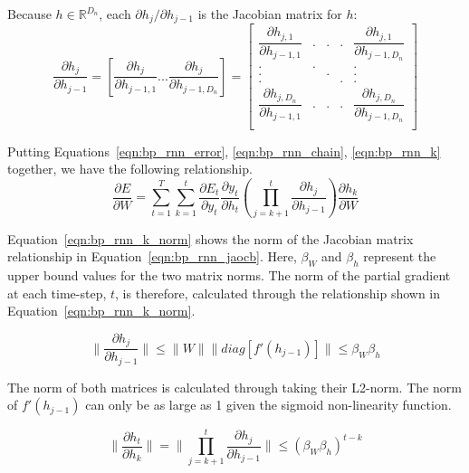 \documentclass{tufte-handout}
\begin{document}
Because $h \in \mathbb{R}^{D_n}$, each $\partial h_j/\partial h_{j-1}$ is the Jacobian matrix for $h$:
\begin{equation}
	\dfrac{\partial h_j}{\partial h_{j-1}} = {[\dfrac{\partial h_{j}}{\partial h_{j-1,1}} ...  \dfrac{\partial h_{j}}{\partial h_{j-1,D_n}}]} =
	\begin{bmatrix}
	\dfrac{\partial h_{j,1}}{\partial h_{j-1,1}} & . & . & . & \dfrac{\partial h_{j,1}}{\partial h_{j-1,D_n}} \\
	. & . & & & . \\
	. & & . & & . \\
	. & & & . & . \\
	\dfrac{\partial h_{j,D_n}}{\partial h_{j-1,1}} & . & . & . & \dfrac{\partial h_{j,D_n}}{\partial h_{j-1,D_n}} \\
	\end{bmatrix}
	\label{eqn:bp_rnn_jaocb}
\end{equation}

Putting Equations~\ref{eqn:bp_rnn_error}, \ref{eqn:bp_rnn_chain}, \ref{eqn:bp_rnn_k} together, we have the following relationship.
\begin{equation}
	\dfrac{\partial E}{\partial W} = \sum_{t=1}^{T}\sum_{k=1}^{t} \dfrac{\partial E_t}{\partial y_t} \dfrac{\partial y_t}{\partial h_t} (\prod_{j=k+1}^{t}\dfrac{\partial h_j}{\partial h_{j-1}}) \dfrac{\partial h_k}{\partial W}
\end{equation}

Equation~\ref{eqn:bp_rnn_k_norm} shows the norm of the Jacobian matrix relationship in Equation~\ref{eqn:bp_rnn_jaocb}. Here, $\beta_W$ and $\beta_h$ represent the upper bound values for the two matrix norms. The norm of the partial gradient at each time-step, $t$, is therefore, calculated through the relationship shown in Equation~\ref{eqn:bp_rnn_k_norm}.

\begin {equation}
	\parallel \dfrac{\partial h_j}{\partial h_{j-1}} \parallel \leq \parallel W\parallel  \parallel diag [f'(h_{j-1})]\parallel \leq \beta_W \beta_h
	\label{eqn:bp_rnn_k_norm}
\end {equation}

The norm of both matrices is calculated through taking their L2-norm. The norm of $f'(h_{j-1})$ can only be as large as 1 given the sigmoid non-linearity function.

\begin {equation}
	\parallel \dfrac{\partial h_t}{\partial h_k} \parallel = \parallel \prod_{j=k+1}^{t} \dfrac{\partial h_j}{\partial h_{j-1}}\parallel \leq (\beta_W \beta_h)^{t-k}
	\label{eqn:bp_rnn_k_norm_total}
\end {equation}
\end{document}
